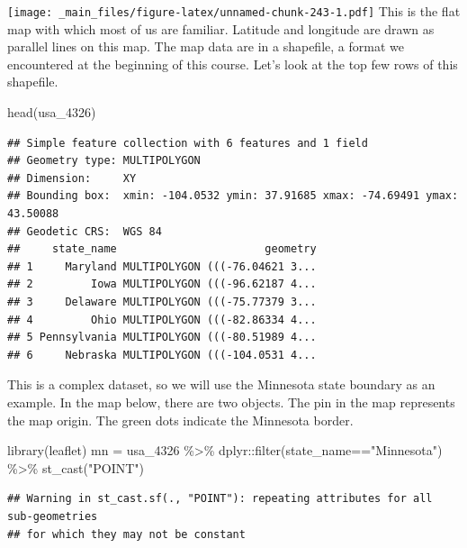 \documentclass[
]{book}
\newenvironment{Shaded}{\begin{snugshade}}{\end{snugshade}}
\newcommand{\FunctionTok}[1]{\textcolor[rgb]{0.00,0.00,0.00}{#1}}
\newcommand{\NormalTok}[1]{#1}
\newcommand{\OtherTok}[1]{\textcolor[rgb]{0.56,0.35,0.01}{#1}}
\newcommand{\SpecialCharTok}[1]{\textcolor[rgb]{0.00,0.00,0.00}{#1}}
\newcommand{\StringTok}[1]{\textcolor[rgb]{0.31,0.60,0.02}{#1}}
\begin{document}
\texttt{[image: \_main\_files/figure-latex/unnamed-chunk-243-1.pdf]}
This is the flat map with which most of us are familiar. Latitude and longitude are drawn as parallel lines on this map. The map data are in a shapefile, a format we encountered at the beginning of this course. Let's look at the top few rows of this shapefile.

\begin{Shaded}
\begin{Highlighting}[]
\FunctionTok{head}\NormalTok{(usa\_4326)}
\end{Highlighting}
\end{Shaded}

\begin{verbatim}
## Simple feature collection with 6 features and 1 field
## Geometry type: MULTIPOLYGON
## Dimension:     XY
## Bounding box:  xmin: -104.0532 ymin: 37.91685 xmax: -74.69491 ymax: 43.50088
## Geodetic CRS:  WGS 84
##     state_name                       geometry
## 1     Maryland MULTIPOLYGON (((-76.04621 3...
## 2         Iowa MULTIPOLYGON (((-96.62187 4...
## 3     Delaware MULTIPOLYGON (((-75.77379 3...
## 4         Ohio MULTIPOLYGON (((-82.86334 4...
## 5 Pennsylvania MULTIPOLYGON (((-80.51989 4...
## 6     Nebraska MULTIPOLYGON (((-104.0531 4...
\end{verbatim}

This is a complex dataset, so we will use the Minnesota state boundary as an example. In the map below, there are two objects. The pin in the map represents the map origin. The green dots indicate the Minnesota border.

\begin{Shaded}
\begin{Highlighting}[]
\FunctionTok{library}\NormalTok{(leaflet)}
\NormalTok{mn }\OtherTok{=}\NormalTok{ usa\_4326 }\SpecialCharTok{\%\textgreater{}\%}
\NormalTok{  dplyr}\SpecialCharTok{::}\FunctionTok{filter}\NormalTok{(state\_name}\SpecialCharTok{==}\StringTok{"Minnesota"}\NormalTok{) }\SpecialCharTok{\%\textgreater{}\%}
  \FunctionTok{st\_cast}\NormalTok{(}\StringTok{"POINT"}\NormalTok{)}
\end{Highlighting}
\end{Shaded}

\begin{verbatim}
## Warning in st_cast.sf(., "POINT"): repeating attributes for all sub-geometries
## for which they may not be constant
\end{verbatim}
\end{document}
